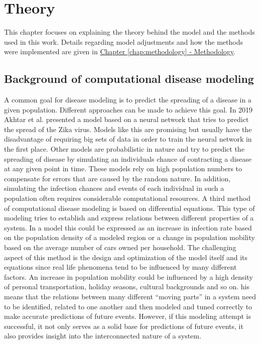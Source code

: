 
\chapter{Theory} %
This chapter focuses on explaining the theory behind the model and the methods used in this work.
Details regarding model adjustments and how the methods were implemented are given in
\hyperref[chap:methodology]{Chapter \ref*{chap:methodology} - Methodology}.

\label{chap:theory} %


\section{Background of computational disease modeling}
A common goal for disease modeling is to predict the spreading of a disease in a given population. Different approaches can be made to
achieve this goal. In 2019 Akhtar et al. presented a model based on a neural network that tries to predict the spread of the Zika virus\cite{akhtar2019dynamic}.
Models like this are promising but usually have the disadvantage of requiring big sets of data in order to train the neural network in the first place.
Other models are probabilistic in nature and try to predict the spreading of disease by simulating an individuals chance of contracting a
disease at any given point in time\cite{nakamura2017efficient,nakamura2020improved}. These models rely on high population numbers to compensate for errors that are caused by the random nature.
In addition, simulating the infection chances and events of each individual in such a population often requires considerable computational resources\cite{nakamura2017efficient}.
A third method of computational disease modeling is based on differential equations. This type of modeling tries to establish and express relations between different
properties of a system. In a model this could be expressed as an increase in infection rate based on the population density of a modeled region or a
change in population mobility based on the average number of cars owned per household. The challenging aspect of this method is the design and
optimization of the model itself and its equations since real life phenomena tend to be influenced by many
different factors. An increase in population mobility could be influenced by a high density of personal transportation, holiday seasons, cultural backgrounds and so on. 
his means that the relations between many
different ``moving parts'' in a system need to be identified, related to one another and then modeled and tuned correctly to make accurate predictions
of future events. However, if this modeling attempt is successful, it not only serves as a solid base for predictions of future events, it also provides insight
into the interconnected nature of a system.


